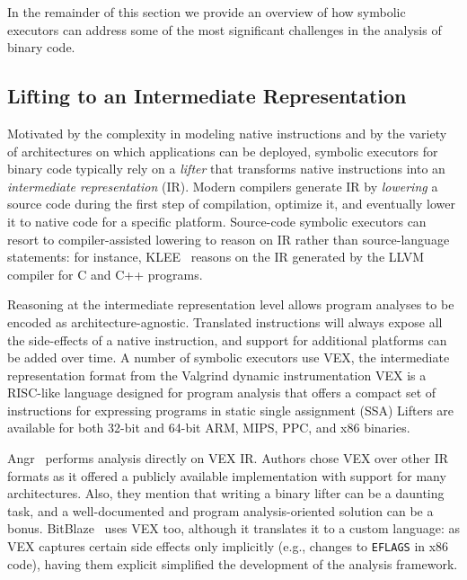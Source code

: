 In the remainder of this section we provide an overview of how symbolic executors can address some of the most significant challenges in the analysis of binary code.

\subsection{Lifting to an Intermediate Representation}
Motivated by the complexity in modeling native instructions and by the variety of architectures on which applications can be deployed, symbolic executors for binary code typically rely on a {\em lifter} that transforms native instructions into an {\em intermediate representation} (IR). Modern compilers generate IR by {\em lowering} a source code during the first step of compilation, optimize it, and eventually lower it to native code for a specific platform. Source-code symbolic executors can resort to compiler-assisted lowering to reason on IR rather than source-language statements: for instance, {\sc KLEE}~\cite{KLEE-OSDI08} reasons on the IR generated by the LLVM compiler for C and C++ programs.

Reasoning at the intermediate representation level allows program analyses to be encoded as architecture-agnostic. Translated instructions will always expose all the side-effects of a native instruction, and support for additional platforms can be added over time. A number of symbolic executors use VEX, the intermediate representation format from the Valgrind dynamic instrumentation  VEX is a RISC-like language designed for program analysis that offers a compact set of instructions for expressing programs in static single assignment (SSA)  Lifters are available for both 32-bit and 64-bit ARM, MIPS, PPC, and x86 binaries.

{\sc Angr}~\cite{ANGR-SSP16} performs analysis directly on VEX IR. Authors chose VEX over other IR formats as it offered a publicly available implementation with support for many architectures. Also, they mention that writing a binary lifter can be a daunting task, and a well-documented and program analysis-oriented solution can be a bonus. {\sc BitBlaze}~\cite{BITBLAZE-ICISS08} uses VEX too, although it translates it to a custom language: as VEX captures certain side effects only implicitly (e.g., changes to {\tt EFLAGS} in x86 code), having them explicit simplified the development of the analysis framework.

